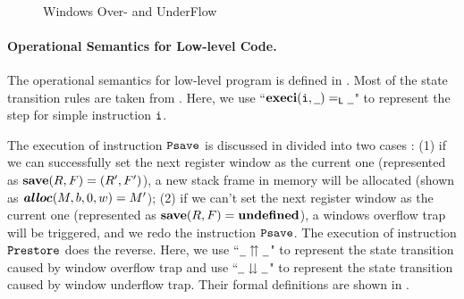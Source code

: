 \begin{figure}[!t]
\[\begin{array}{c}
{\begin{array}{c}
				\end{array}
			}
		\end{array}
    \]
    \caption{Windows Over- and UnderFlow}
    \label{fig:Windows Over- and UnderFlow}
    \vspace{-0.5em}
\end{figure}

\paragraph{\bf Operational Semantics for Low-level Code.} 
The operational semantics for low-level program is defined in 
\Fig{\ref{fig:selected-opsem-low-level-program}}. Most of the 
state transition rules are taken from 
\Fig{\ref{Selected Operational Semantics}}. Here, we use 
``$\textbf{execi}{{(\texttt{i}{}, \underline{\ \,})}} =_{\textsf{L}} {\underline{\ \,}}$" to represent 
the step for simple instruction $\texttt{i}{}$.

The execution of instruction $\texttt{Psave}$ is discussed in divided 
into two cases : (1) if we can successfully set the next register 
window as the current one (represented as 
$\textbf{save}{(R, F)} = (R', F')$),   
a new stack frame in memory will be allocated
(shown as $\textbf{\textit{alloc}}(M, b, 0, w) = M'$); 
(2) if we can't set the next register window as the current 
one (represented as $\textbf{save}{(R, F)} = \textbf{undefined}$), 
a windows overflow trap will be triggered, and we redo the 
instruction $\texttt{Psave}$. The execution of instruction $\texttt{Prestore}$ 
does the reverse. Here, we use ``${\underline{\ \,}} \upuparrows {\underline{\ \,}}$" 
to represent the state transition caused by window overflow trap and 
use ``${\underline{\ \,}} \downdownarrows {\underline{\ \,}}$" to represent the state 
transition caused by window underflow trap. Their formal definitions 
are shown in \Fig{\ref{fig:Windows Over- and UnderFlow}}. 
